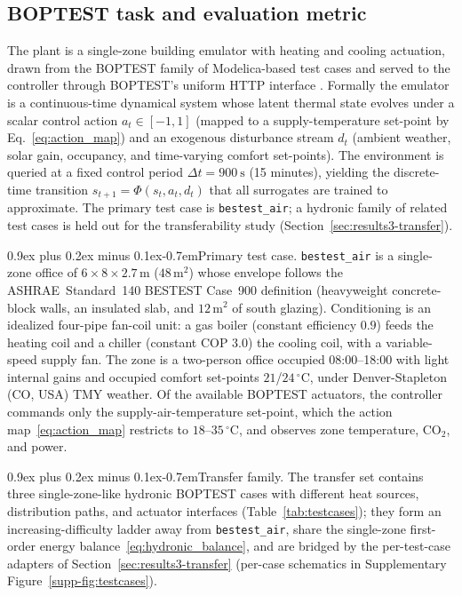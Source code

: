\documentclass[a4paper,fleqn]{cas-sc}
\makeatletter
\renewcommand\paragraph{\@startsection{paragraph}{4}{\z@}%
 {0.9ex plus 0.2ex minus 0.1ex}{-0.7em}{\normalfont\normalsize\bfseries}}
\newcommand{\suppref}[1]{\ref{supp-#1}}
\makeatother
\begin{document}
\subsection{BOPTEST task and evaluation metric}\label{ssec:m-env}\label{ssec:m-pomdp}
The plant is a single-zone building emulator with heating and cooling actuation, drawn from the
BOPTEST family of Modelica-based test cases \citep{Blum2021BOPTEST,Wetter2014Modelica}
and served to the controller through BOPTEST's uniform HTTP interface
\citep{Arroyo2021GymBOPTEST}. Formally the emulator is a continuous-time
dynamical system whose latent thermal state evolves under a scalar control action
$a_t\in[-1,1]$ (mapped to a supply-temperature set-point by Eq.~\eqref{eq:action_map}) and an exogenous disturbance stream $d_t$ (ambient weather,
solar gain, occupancy, and time-varying comfort set-points). The environment is queried
at a fixed control period $\Delta t = \SI{900}{\second}$ (15 minutes), yielding the
discrete-time transition $s_{t+1}=\Phi(s_t,a_t,d_t)$ that all surrogates are trained
to approximate. The primary test case is \texttt{bestest\_air}; a hydronic family of
related test cases is held out for the transferability study (Section~\ref{sec:results3-transfer}).

\paragraph{Primary test case.} \texttt{bestest\_air} is a single-zone office of $6\times8\times2.7$\,m ($48$\,m$^2$) whose envelope follows the ASHRAE~Standard~140 BESTEST Case~900 definition (heavyweight concrete-block walls, an insulated slab, and $12$\,m$^2$ of south glazing). Conditioning is an idealized four-pipe fan-coil unit: a gas boiler (constant efficiency $0.9$) feeds the heating coil and a chiller (constant COP $3.0$) the cooling coil, with a variable-speed supply fan. The zone is a two-person office occupied 08:00--18:00 with light internal gains and occupied comfort set-points $21$/$24\,^\circ$C, under Denver-Stapleton (CO, USA) TMY weather. Of the available BOPTEST actuators, the controller commands only the supply-air-temperature set-point, which the action map~\eqref{eq:action_map} restricts to $18$--$35\,^\circ$C, and observes zone temperature, CO$_2$, and power.

\paragraph{Transfer family.} The transfer set contains three single-zone-like hydronic BOPTEST cases with different heat sources, distribution paths, and actuator interfaces (Table~\ref{tab:testcases}); they form an increasing-difficulty ladder away from \texttt{bestest\_air}, share the single-zone first-order energy balance~\eqref{eq:hydronic_balance}, and are bridged by the per-test-case adapters of Section~\ref{sec:results3-transfer} (per-case schematics in Supplementary Figure~\suppref{fig:testcases}).
\end{document}
